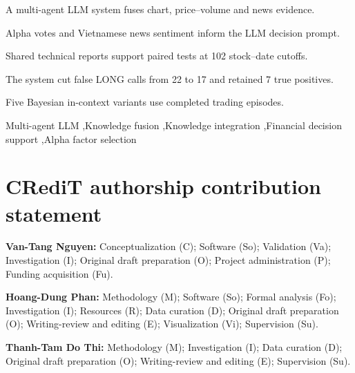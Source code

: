 \documentclass[preprint,12pt]{elsarticle}
\begin{document}
\begin{frontmatter}


\begin{highlights}
\item A multi-agent LLM system fuses chart, price--volume and news evidence.
\item Alpha votes and Vietnamese news sentiment inform the LLM decision prompt.
\item Shared technical reports support paired tests at 102 stock--date cutoffs.
\item The system cut false LONG calls from 22 to 17 and retained 7 true positives.
\item Five Bayesian in-context variants use completed trading episodes.
\end{highlights}

\begin{keyword}
Multi-agent LLM \sep Knowledge fusion \sep Knowledge integration \sep Financial decision support \sep Alpha factor selection
\end{keyword}

\end{frontmatter}











\section*{CRediT authorship contribution statement}

\textbf{Van-Tang Nguyen:} Conceptualization (C); Software (So); Validation (Va); Investigation (I); Original draft preparation (O); Project administration (P); Funding acquisition (Fu).

\textbf{Hoang-Dung Phan:} Methodology (M); Software (So); Formal analysis (Fo); Investigation (I); Resources (R); Data curation (D); Original draft preparation (O); Writing-review and editing (E); Visualization (Vi); Supervision (Su).

\textbf{Thanh-Tam Do Thi:} Methodology (M); Investigation (I); Data curation (D); Original draft preparation (O); Writing-review and editing (E); Supervision (Su).
\end{document}
